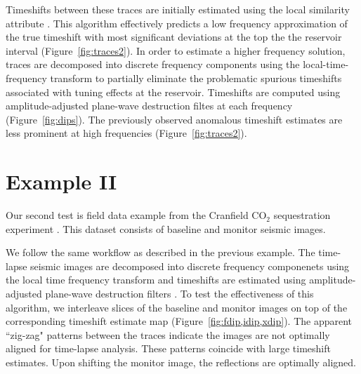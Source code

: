 Timeshifts between these traces are initially estimated using the local similarity attribute \cite[]{fomel09}.
This algorithm effectively predicts a low frequency approximation of the true timeshift with most significant deviations at the top the the reservoir interval (Figure~\ref{fig:traces2}).
In order to estimate a higher frequency solution, traces are decomposed into discrete frequency components using the local-time-frequency transform \cite[]{liu} to partially eliminate the problematic spurious timeshifts associated with tuning effects at the reservoir.
Timeshifts are computed using amplitude-adjusted plane-wave destruction filtes at each frequency (Figure~\ref{fig:dips}).
The previously observed anomalous timeshift estimates are less prominent at high frequencies (Figure~\ref{fig:traces2}).



\section{Example II}

Our second test is field data example from the Cranfield CO$_2$ sequestration experiment \cite[]{zhang13}.
This dataset consists of baseline and monitor seismic images.

We follow the same workflow as described in the previous example.
The time-lapse seismic images are decomposed into discrete frequency componenets using the local time frequency transform \cite[]{liu} and timeshifts are estimated using amplitude-adjusted plane-wave destruction filters \cite[]{phillips}.
To test the effectiveness of this algorithm, we interleave slices of the baseline and monitor images on top of the corresponding timeshift estimate map (Figure~\ref{fig:fdip,idip,xdip}).
The apparent ``zig-zag" patterns between the traces indicate the images are not optimally aligned for time-lapse analysis.
These patterns coincide with large timeshift estimates.
Upon shifting the monitor image, the reflections are optimally aligned.

